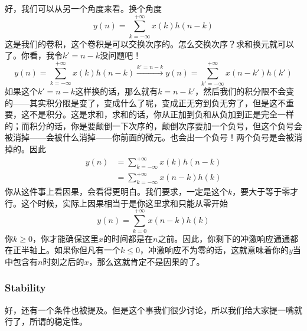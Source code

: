 \documentclass[a4paper,12pt]{article}
\begin{document}
好，我们可以从另一个角度来看。换个角度
\begin{equation}
   y(n) = \sum_{k=-\infty}^{+\infty}x(k)h(n-k)
\end{equation}
这是我们的卷积，这个卷积是可以交换次序的。怎么交换次序？求和换元就可以了。你看，我令$k' = n-k$没问题吧！
\begin{equation}
   y(n) = \sum_{k=-\infty}^{+\infty}x(k)h(n-k)\xrightarrow{k'=n-k}y(n) = \sum_{k'=-\infty}^{+\infty}x(n-k')h(k')
\end{equation}
如果这个$k' = n-k$这样换的话，那么就有$k = n-k'$，然后我们的积分限不会变的——其实积分限是变了，变成什么了呢，变成正无穷到负无穷了，但是这不重要，这不是积分。这是求和，求和的话，你从正加到负和从负加到正是完全一样的；而积分的话，你是要颠倒一下次序的，颠倒次序要加一个负号，但这个负号会被消掉——会被什么消掉——你前面的微元。也会出一个负号！两个负号是会被消掉的。因此
\begin{equation}
\begin{aligned}
   y(n) &= \sum_{k=-\infty}^{+\infty}x(k)h(n-k)\\
&= \sum_{k=-\infty}^{+\infty}x(n-k)h(k)
\end{aligned}
\end{equation}
你从这件事上看因果，会看得更明白。我们要求，一定是这个$k$，要大于等于零才行。这个时候，实际上因果相当于是你这里求和只能从零开始
\begin{equation}
   y(n) = \sum_{k=0}^{+\infty}x(n-k)h(k)
\end{equation}
你$k \ge 0$，你才能确保这里$x$的时间都是在$n$之前。因此，你剩下的冲激响应通通都在正半轴上。如果你但凡有一个$k\le0$，冲激响应不为零的话，这就意味着你的$y$当中包含有$n$时刻之后的$x$，那么这就肯定不是因果的了。

\subsubsection{Stability}\quad

好，还有一个条件也被提及。但是这个事我们很少讨论，所以我们给大家提一嘴就行了，所谓的稳定性。
\end{document}
